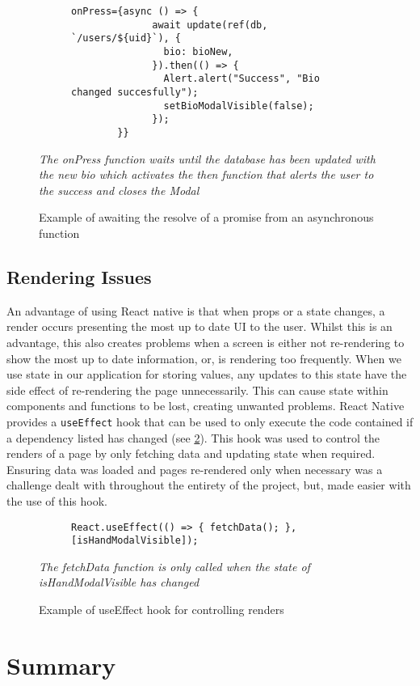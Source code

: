 \begin{figure}[!htbp]
    \centering
    \begin{subfigure}[b]{0.8\textwidth}
        \begin{lstlisting}[language=jsJsx]
        onPress={async () => {
              await update(ref(db, `/users/${uid}`), {
                bio: bioNew,
              }).then(() => {
                Alert.alert("Success", "Bio changed succesfully");
                setBioModalVisible(false);
              });
        }}
        \end{lstlisting}
    \end{subfigure}
\caption{Example of awaiting the resolve of a promise from an asynchronous function}
\small\textit{The onPress function waits until the database has been updated with the new bio which activates the then function that alerts the user to the success and closes the Modal}
\label{fig:asyncAwait}
\end{figure}
\FloatBarrier

\subsection*{Rendering Issues}
An advantage of using React native is that when props or a state changes, a render occurs presenting the most up to date UI to the user. Whilst this is an advantage, this also creates problems when a screen is either not re-rendering to show the most up to date information, or, is rendering too frequently. When we use state in our application for storing values, any updates to this state have the side effect of re-rendering the page unnecessarily. This can cause state within components and functions to be lost, creating unwanted problems. React Native provides a \texttt{useEffect} hook that can be used to only execute the code contained if a dependency listed has changed (see \ref{fig:useEffect}). This hook was used to control the renders of a page by only fetching data and updating state when required. Ensuring data was loaded and pages re-rendered only when necessary was a challenge dealt with throughout the entirety of the project, but, made easier with the use of this hook.
\begin{figure}[!htbp]
    \centering
    \begin{subfigure}[b]{0.8\textwidth}
        \begin{lstlisting}[language=jsJsx]
        React.useEffect(() => { fetchData(); }, [isHandModalVisible]);
        \end{lstlisting}
    \end{subfigure}
\caption{Example of useEffect hook for controlling renders}
\small\textit{The fetchData function is only called when the state of isHandModalVisible has changed}
\label{fig:useEffect}
\end{figure}
\FloatBarrier
\section{Summary}